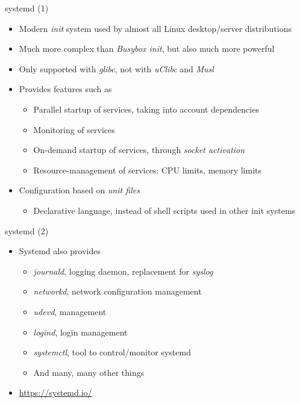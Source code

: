 \begin{frame}{systemd (1)}
  \begin{itemize}
  \item Modern {\em init} system used by almost all Linux
    desktop/server distributions
  \item Much more complex than {\em Busybox init}, but also much more
    powerful
  \item Only supported with {\em glibc}, not with {\em uClibc} and {\em Musl}
  \item Provides features such as
    \begin{itemize}
    \item Parallel startup of services, taking into account
      dependencies
    \item Monitoring of services
    \item On-demand startup of services, through {\em socket
        activation}
    \item Resource-management of services: CPU limits, memory limits
    \end{itemize}
  \item Configuration based on {\em unit files}
    \begin{itemize}
    \item Declarative language, instead of shell scripts used in other
      init systems
    \end{itemize}
  \end{itemize}
\end{frame}

\begin{frame}{systemd (2)}
  \begin{itemize}
  \item Systemd also provides
    \begin{itemize}
    \item {\em journald}, logging daemon, replacement for {\em syslog}
    \item {\em networkd}, network configuration management
    \item {\em udevd},  management
    \item {\em logind}, login management
    \item {\em systemctl}, tool to control/monitor systemd
    \item And many, many other things
    \end{itemize}
  \item \url{https://systemd.io/}
  \end{itemize}
\end{frame}


